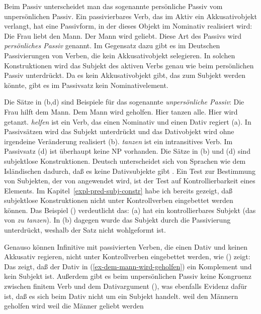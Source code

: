 \noindent
Beim Passiv unterscheidet man das sogenannte persönliche Passiv vom unpersönlichen Passiv.
Ein passivierbares Verb, das im Aktiv ein Akkusativobjekt verlangt, hat eine Passivform,
in der dieses Objekt im Nominativ realisiert wird:
\eal
\label{ex-agentive-passive}
\ex Die Frau liebt den Mann.
\ex Der Mann wird geliebt.
\zl
Diese Art des Passivs wird \emph{persönliches Passiv} genannt.
Im Gegensatz dazu gibt es im Deutschen Passivierungen von Verben, die kein
Akkusativobjekt selegieren. In solchen Konstruktionen wird das Subjekt
des aktiven Verbs genau wie beim persönlichen Passiv unterdrückt.
Da es kein Akkusativobjekt gibt, das zum Subjekt
werden könnte, gibt es im Passivsatz kein Nominativelement.

Die Sätze in (b,d) sind Beispiele für das sogenannte \emph{unpersönliche Passiv}:
\eal
\label{ex-agentive-passive-dat}
\ex Die Frau hilft dem Mann.
\ex\label{ex-dem-mann-wird-geholfen} 
Dem Mann wird geholfen.
\ex Hier tanzen alle.
\ex\label{ex-hier-wird-getanzt}
Hier wird getanzt.
\zl
\emph{helfen} ist ein Verb, das einen Nominativ und einen Dativ regiert (a).
In Passivsätzen wird das Subjekt unterdrückt und das Dativobjekt wird ohne
irgendeine Veränderung realisiert (b). \emph{tanzen} ist ein intransitives Verb.
Im Passivsatz (d) ist überhaupt keine NP vorhanden. Die Sätze in (b) und (d)
sind subjektlose Konstruktionen. 
Deutsch unterscheidet sich von Sprachen wie dem Isländischen
dadurch, daß es keine Dativsubjekte\label{page-dativsubjekte}
gibt \citep*{ZMT85a}.
Ein Test zur Bestimmung von Subjekten, der von \citet*[]{ZMT85a} angewendet wird,
ist der Test auf Kontrollierbarkeit eines Elements. Im Kapitel~\ref{expl-pred-subj-constr} habe ich bereits
gezeigt, daß subjektlose Konstruktionen nicht unter Kontrollverben eingebettet werden können.
Das Beispiel () verdeutlicht das:
\eal
{}
\zl
(a) hat ein kontrollierbares Subjekt (das von \emph{zu tanzen}). In (b) dagegen wurde das
Subjekt durch die Passivierung unterdrückt, weshalb der Satz nicht wohlgeformt ist.

Genauso können Infinitive mit passivierten Verben, die einen Dativ und keinen Akkusativ regieren,
nicht unter Kontrollverben eingebettet werden, wie () zeigt:
\z
Das zeigt, daß der Dativ in (\ref{ex-dem-mann-wird-geholfen}) ein Komplement und kein Subjekt ist.
Außerdem gibt es beim unpersönlichen Passiv keine Kongruenz zwischen finitem Verb und dem Dativargument
(), was ebenfalls Evidenz dafür ist, daß es sich beim Dativ nicht um ein Subjekt
handelt.
\eal
\ex weil den Männern geholfen wird
\ex weil die Männer geliebt werden
\zl


